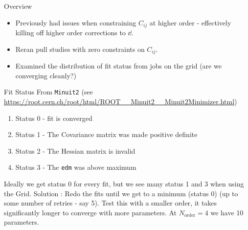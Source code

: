 \newcommand{\allprojod}[3]{
    \projod{#1}{#2}{#3}{KK}{s01}
    \projod{#1}{#2}{#3}{Kspi0}{s01}
    \projod{#1}{#2}{#3}{Kppim}{s01}
    \projod{#1}{#2}{#3}{Kmpip}{s01}
    \projod{#1}{#2}{#3}{Kspipi}{s01}

}
\begin{frame}{Overview}
    \begin{itemize}
        \item Previously had issues when constraining $C_{ij}$ at higher order - effectively killing off higher order corrections to $\dd$.
        \item Reran pull studies with zero constraints on $C_{ij}$.
        \item Examined the distribution of fit status from jobs on the grid (are we converging cleanly?)
        \end{itemize}
\end{frame}

\begin{frame}{Fit Status}
    From \texttt{Minuit2} (see \url{https://root.cern.ch/root/html/ROOT__Minuit2__Minuit2Minimizer.html})
    \begin{enumerate}
        \item Status 0 - fit is converged
        \item Status 1 - The Covariance matrix was made positive definite 
        \item Status 2 - The Hessian matrix is invalid 
        \item Status 3 - The \texttt{edm} was above maximum
    \end{enumerate}
    Ideally we get status 0 for every fit, but we see many status 1 and 3 when using the Grid.
    Solution : Redo the fits until we get to a minimum (status 0) (up to some number of retries - say 5).
    Test this with a smaller order, it takes significantly longer to converge with more parameters. At $N_\text{order}=4$ we have 10 parameters.
\end{frame}


